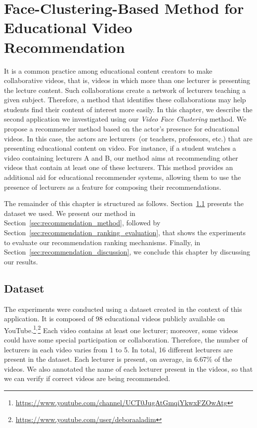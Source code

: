 \newpage
\chapter{Face-Clustering-Based Method for Educational Video Recommendation}
\label{chap:educational_recommendation}

It is a common practice among educational content creators to make collaborative videos, that is, videos in which more than one lecturer is presenting the lecture content.
Such collaborations create a network of lecturers teaching a given subject.
Therefore, a method that identifies these collaborations may help students find their content of interest more easily.
In this chapter, we describe the second application we investigated using our \emph{Video Face Clustering} method.
We propose a recommender method based on the actor's presence for educational videos. In this case, the actors are lecturers~(or teachers, professors, etc.) that are presenting educational content on video.
For instance, if a student watches a video containing lecturers A and B, our method aims at recommending other videos that contain at least one of these lecturers. 
This method provides an additional aid for educational recommender systems, allowing them to use the presence of lecturers as a feature for composing their recommendations.

The remainder of this chapter is structured as follows.
Section~\ref{sec:recommendation_dataset} presents the dataset we used.
We present our method in Section~\ref{sec:recommendation_method}, followed by 
Section~\ref{sec:recommendation_ranking_evaluation}, that shows the experiments to evaluate our recommendation ranking mechanisms.
Finally, in Section~\ref{sec:recommendation_discussion}, we conclude this chapter by discussing our results.

\section{Dataset}
\label{sec:recommendation_dataset}

The experiments were conducted using a dataset created in the context of this application.
It is composed of 98 educational videos publicly available on YouTube.\footnote{\url{https://www.youtube.com/channel/UCT0JugAtGmqiYkwxFZOwAtg}}$^{,}$\footnote{\url{https://www.youtube.com/user/deboraaladim}}
Each video contains at least one lecturer; moreover, some videos could have some special participation or collaboration. Therefore, the number of lecturers in each video varies from 1 to 5. In total, 16 different lecturers are present in the dataset. Each lecturer is present, on average, in 6.67\% of the videos.
We also annotated the name of each lecturer present in the videos, so that we can verify if correct videos are being recommended.

